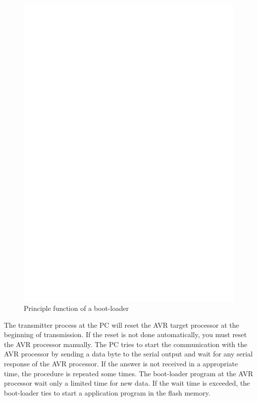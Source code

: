 \begin{figure}[H]
\centering
\includegraphics[]{../FIG/ablauf.eps}
\caption{Principle function of a boot-loader}
\label{fig:ablauf}
\end{figure}

The transmitter process at the PC will reset the AVR target processor at
the beginning of transmission.
If the reset is not done automatically, you must reset the AVR processor 
manually. 
The PC tries to start the communication with the AVR processor by sending
a data byte to the serial output and wait for any serial response of
the AVR processor.
If the answer is not received in a appropriate time, the procedure is repeated
some times.
The boot-loader program at the AVR processor wait only a limited time for
new data. If the wait time is exceeded, the boot-loader ties to
start a application program in the flash memory.
